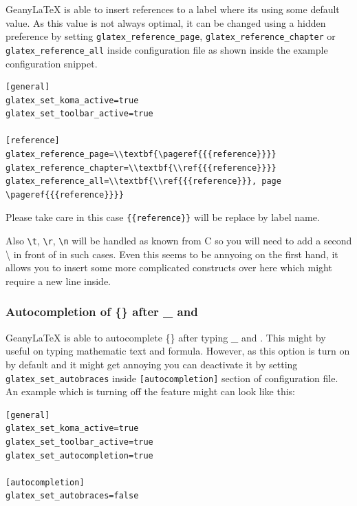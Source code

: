 \documentclass[%
paper=a4,%
fontsize=11pt,%
twoside=false,%
DIV18,%
headsepline,%
plainheadsepline,%
footsepline,%
plainfootsepline,%
bibliography=totoc,%
listof=totoc,%
BCOR10mm,%
parskip=half,%
openany,%
]{scrartcl}
\begin{document}
Geany\LaTeX{} is able to insert references to a label where its
using some default value. As this value is not always optimal, it
can be changed using a hidden preference by setting
\texttt{glatex\_reference\_page}, \texttt{glatex\_reference\_chapter} or
\texttt{glatex\_reference\_all} inside configuration file as shown inside
the example configuration snippet.

\begin{lstlisting}[caption={Configuration example for customized reference strings}]
[general]
glatex_set_koma_active=true
glatex_set_toolbar_active=true

[reference]
glatex_reference_page=\\textbf{\pageref{{{reference}}}}
glatex_reference_chapter=\\textbf{\\ref{{{reference}}}}
glatex_reference_all=\\textbf{\\ref{{{reference}}}, page \pageref{{{reference}}}}
\end{lstlisting}

Please take care in this case \texttt{\{\{reference\}\}} will be
replace by label name.

Also \texttt{\textbackslash{}t}, \texttt{\textbackslash{}r},
\texttt{\textbackslash{}n} will be handled as known from C so you will
need to add a second \textbackslash{} in front of in such cases. Even
this seems to be annyoing on the first hand, it allows you to insert some
more complicated constructs over  here which might require a new line inside.


\subsubsection{Autocompletion of \{\} after \_ and }
\label{sec:autoadding_of_braces}
Geany\LaTeX{} is able to autocomplete \{\} after typing \_ and
. This might by useful on typing mathematic text and
formula. However, as this option is turn on by default and it might
get annoying you can deactivate it by setting \texttt{glatex\_set\_autobraces}
inside \texttt{[autocompletion]} section of configuration file. An example
which is turning off the feature might can look like this:

\begin{lstlisting}[caption={Configuration example for autocompletion of %
							\{\} after \_ and \symbol{94}}]
[general]
glatex_set_koma_active=true
glatex_set_toolbar_active=true
glatex_set_autocompletion=true

[autocompletion]
glatex_set_autobraces=false
\end{lstlisting}
\end{document}
